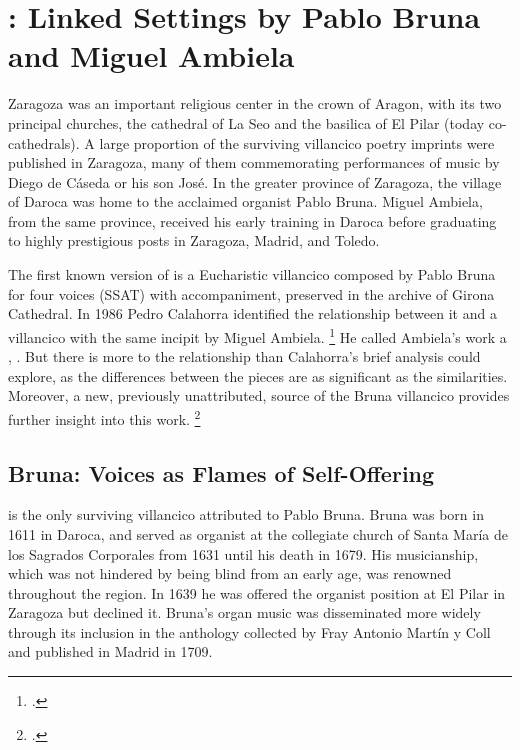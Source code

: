 \section{: Linked Settings by Pablo Bruna
and Miguel Ambiela}

Zaragoza was an important religious center in the crown of Aragon, with its two
principal churches, the cathedral of La Seo and the basilica of El Pilar (today
co-cathedrals).  
A large proportion of the surviving villancico poetry imprints were published
in Zaragoza, many of them commemorating performances of music by Diego de
Cáseda or his son José.
In the greater province of Zaragoza, the village of Daroca was home to the
acclaimed organist Pablo Bruna.  
Miguel Ambiela, from the same province, received his early training in Daroca
before graduating to highly prestigious posts in Zaragoza, Madrid, and Toledo.

The first known version of  is a Eucharistic
villancico composed by Pablo Bruna for four voices (SSAT) with accompaniment,
preserved in the archive of Girona Cathedral.%
    \citXXX[signature]
In 1986 Pedro Calahorra identified the relationship between it and a 
villancico with the same incipit by Miguel Ambiela.%
    \footnote{.}
He called Ambiela's work a , .%
    \Autocite[9]{Calahorra:Suban}
But there is more to the relationship than Calahorra's brief analysis could
explore, as the differences between the pieces are as significant as the
similarities.
Moreover, a new, previously unattributed, source of the Bruna villancico
provides further insight into this work.%
    \footnote{.}

\subsection{Bruna: Voices as Flames of Self-Offering}

 is the only surviving villancico attributed to Pablo
Bruna.
Bruna was born in 1611 in Daroca, and served as organist at the collegiate
church of Santa María de los Sagrados Corporales from 1631 until his death in
1679.%
    \Autocite[104]{Calahorra:Aragon}
His musicianship, which was not hindered by being blind from an early age, was
renowned throughout the region.
In 1639 he was offered the organist position at El Pilar in Zaragoza but
declined it.%
    \Autocite[123--125]{Calahorra:Aragon}
Bruna's organ music was disseminated more widely through its inclusion in the
anthology  collected by Fray
Antonio Martín y Coll and published in Madrid in 1709.


